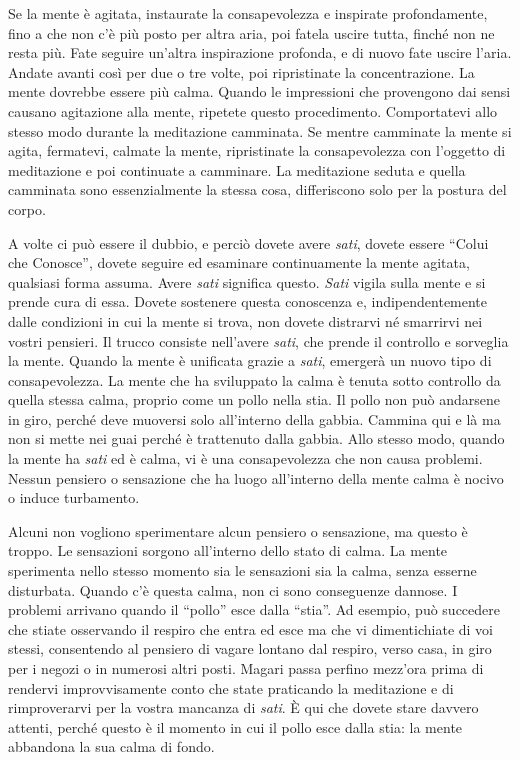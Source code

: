 Se la mente è agitata, instaurate la consapevolezza e inspirate
profondamente, fino a che non c'è più posto per altra aria, poi fatela
uscire tutta, finché non ne resta più. Fate seguire un'altra
inspirazione profonda, e di nuovo fate uscire l'aria. Andate avanti così
per due o tre volte, poi ripristinate la concentrazione. La mente
dovrebbe essere più calma. Quando le impressioni che provengono dai
sensi causano agitazione alla mente, ripetete questo procedimento.
Comportatevi allo stesso modo durante la meditazione camminata. Se
mentre camminate la mente si agita, fermatevi, calmate la mente,
ripristinate la consapevolezza con l'oggetto di meditazione e poi
continuate a camminare. La meditazione seduta e quella camminata sono
essenzialmente la stessa cosa, differiscono solo per la postura del
corpo.

A volte ci può essere il dubbio, e perciò dovete avere \emph{sati},
dovete essere ``Colui che Conosce'', dovete seguire ed esaminare
continuamente la mente agitata, qualsiasi forma assuma. Avere
\emph{sati} significa questo. \emph{Sati} vigila sulla mente e si prende
cura di essa. Dovete sostenere questa conoscenza e, indipendentemente
dalle condizioni in cui la mente si trova, non dovete distrarvi né
smarrirvi nei vostri pensieri. Il trucco consiste nell'avere
\emph{sati}, che prende il controllo e sorveglia la mente. Quando la
mente è unificata grazie a \emph{sati}, emergerà un nuovo tipo di
consapevolezza. La mente che ha sviluppato la calma è tenuta sotto
controllo da quella stessa calma, proprio come un pollo nella stia. Il
pollo non può andarsene in giro, perché deve muoversi solo all'interno
della gabbia. Cammina qui e là ma non si mette nei guai perché è
trattenuto dalla gabbia. Allo stesso modo, quando la mente ha
\emph{sati} ed è calma, vi è una consapevolezza che non causa problemi.
Nessun pensiero o sensazione che ha luogo all'interno della mente calma
è nocivo o induce turbamento.

Alcuni non vogliono sperimentare alcun pensiero o sensazione, ma questo
è troppo. Le sensazioni sorgono all'interno dello stato di calma. La
mente sperimenta nello stesso momento sia le sensazioni sia la calma,
senza esserne disturbata. Quando c'è questa calma, non ci sono
conseguenze dannose. I problemi arrivano quando il ``pollo'' esce dalla
``stia''. Ad esempio, può succedere che stiate osservando il respiro che
entra ed esce ma che vi dimentichiate di voi stessi, consentendo al
pensiero di vagare lontano dal respiro, verso casa, in giro per i negozi
o in numerosi altri posti. Magari passa perfino mezz'ora prima di
rendervi improvvisamente conto che state praticando la meditazione e di
rimproverarvi per la vostra mancanza di \emph{sati}. È qui che dovete
stare davvero attenti, perché questo è il momento in cui il pollo esce
dalla stia: la mente abbandona la sua calma di fondo.

